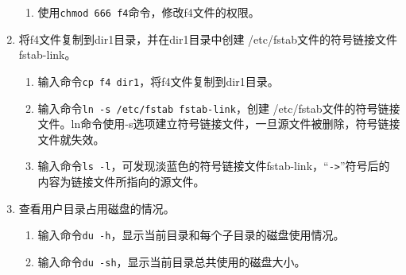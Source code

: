 \begin{enumerate}
\begin{enumerate}
      \item 使用\verb|chmod 666 f4|命令，修改f4文件的权限。
    \end{enumerate}
  \item 将f4文件复制到dir1目录，并在dir1目录中创建 /etc/fstab文件的符号链接文件fstab-link。
    \begin{enumerate}
      \item 输入命令\verb|cp f4 dir1|，将f4文件复制到dir1目录。
      \item 输入命令\verb|ln -s /etc/fstab fstab-link|，创建 /etc/fstab文件的符号链接文件。ln命令使用-s选项建立符号链接文件，一旦源文件被删除，符号链接文件就失效。
      \item 输入命令\verb|ls -l|，可发现淡蓝色的符号链接文件fstab-link，“\verb|->|”符号后的内容为链接文件所指向的源文件。
    \end{enumerate}
  \item 查看用户目录占用磁盘的情况。
    \begin{enumerate}
      \item 输入命令\verb|du -h|，显示当前目录和每个子目录的磁盘使用情况。
      \item 输入命令\verb|du -sh|，显示当前目录总共使用的磁盘大小。
    \end{enumerate}
\end{enumerate}

